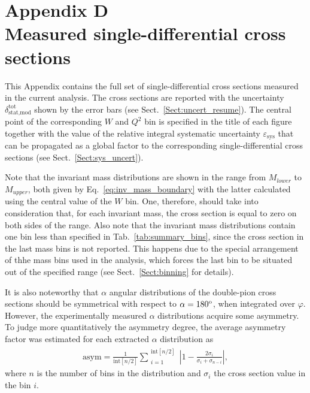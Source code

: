 \chapter*{Appendix D \\\tiny\vspace{-0.4\baselineskip} \LARGE Measured single-differential cross sections}
\label{app_cr_sect}


This Appendix contains the full set of single-differential cross sections measured in the current analysis. The cross sections are reported with the uncertainty $\delta_{\text{stat,mod}}^{\text{tot}}$ shown by the error bars (see Sect.~\ref{Sect:uncert_resume}). The central point of the corresponding $W$ and $Q^{2}$ bin is specified in the title of each figure together with the value of the relative integral systematic uncertainty $\varepsilon_{\text{sys}}$ that can be propagated as a global factor to the corresponding single-differential cross sections (see Sect.~\ref{Sect:sys_uncert}).

Note that the invariant mass distributions are shown in the range from $M_{lower}$ to $M_{upper}$, both given by Eq.~\eqref{eq:inv_mass_boundary} with the latter calculated using the central value of the $W$ bin. One, therefore, should take into consideration that, for each invariant mass, the cross section is equal to zero on both sides of the range. Also note that the invariant mass distributions contain one bin less than specified in Tab.~\ref{tab:summary_bins}, since the cross section in the last mass bins is not reported. This happens due to the special arrangement of thhe mass bins used in the analysis, which forces the last bin to be situated out of the specified range (see Sect.~\ref{Sect:binning} for details).  


It is also noteworthy that $\alpha$ angular distributions of the double-pion cross sections should be symmetrical with respect to $\alpha = 180^{\rm o}$, when integrated over $\varphi$. However, the experimentally measured $\alpha$ distributions acquire some asymmetry. To judge more quantitatively the asymmetry degree, the average asymmetry factor was estimated for each extracted $\alpha$ distribution as\newpage
\begin{equation}
\begin{aligned}
\textrm{asym} = \frac{1}{\textrm{int} [ n/2]} \sum_{\substack{i = 1}}^{\substack{\textrm{int}[ n/2]}} \left | 1 - \frac{2\sigma_{i}}{\sigma_{i}+\sigma_{n-i}}\right |,
\label{eq:asym}
\end{aligned}
\end{equation}
where $n$ is the number of bins in the distribution and $\sigma_{i}$ the cross section value in the bin $i$.

